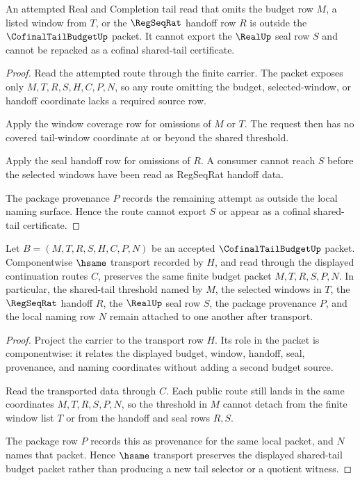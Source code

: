 \begin{theorem}
\label{thm:cofinal-tail-budget-nonescape}
An attempted Real and Completion tail read that omits the budget row $M$, a listed window from $T$, or the $\RegSeqRat$ handoff row $R$ is outside the $\CofinalTailBudgetUp$ packet. It cannot export the $\RealUp$ seal row $S$ and cannot be repacked as a cofinal shared-tail certificate.
\end{theorem}
\begin{proof}
Read the attempted route through the finite carrier. The packet exposes only $M,T,R,S,H,C,P,N$, so any route omitting the budget, selected-window, or handoff coordinate lacks a required source row.

Apply the window coverage row for omissions of $M$ or $T$. The request then has no covered tail-window coordinate at or beyond the shared threshold.

Apply the seal handoff row for omissions of $R$. A consumer cannot reach $S$ before the selected windows have been read as RegSeqRat handoff data.

The package provenance $P$ records the remaining attempt as outside the local naming surface. Hence the route cannot export $S$ or appear as a cofinal shared-tail certificate.
\end{proof}

\begin{theorem}
\label{thm:cofinal-tail-budget-budget-stability}
Let $B=(M,T,R,S,H,C,P,N)$ be an accepted $\CofinalTailBudgetUp$ packet. Componentwise $\hsame$ transport recorded by $H$, and read through the displayed continuation routes $C$, preserves the same finite budget packet $M,T,R,S,P,N$. In particular, the shared-tail threshold named by $M$, the selected windows in $T$, the $\RegSeqRat$ handoff $R$, the $\RealUp$ seal row $S$, the package provenance $P$, and the local naming row $N$ remain attached to one another after transport.
\end{theorem}
\begin{proof}
Project the carrier to the transport row $H$. Its role in the packet is componentwise: it relates the displayed budget, window, handoff, seal, provenance, and naming coordinates without adding a second budget source.

Read the transported data through $C$. Each public route still lands in the same coordinates $M,T,R,S,P,N$, so the threshold in $M$ cannot detach from the finite window list $T$ or from the handoff and seal rows $R,S$.

The package row $P$ records this as provenance for the same local packet, and $N$ names that packet. Hence $\hsame$ transport preserves the displayed shared-tail budget packet rather than producing a new tail selector or a quotient witness.
\end{proof}

